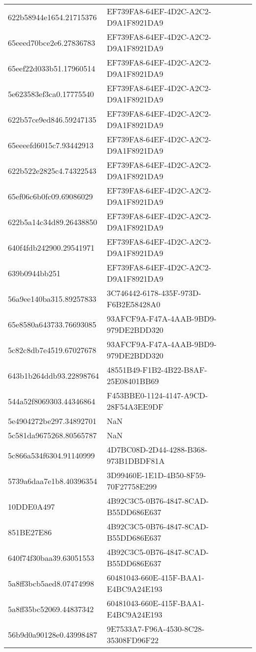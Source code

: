 \begin{tabular}{ll}
622b58944e1654.21715376 & EF739FA8-64EF-4D2C-A2C2-D9A1F8921DA9 \\
65eeed70bce2e6.27836783 & EF739FA8-64EF-4D2C-A2C2-D9A1F8921DA9 \\
65eef22d033b51.17960514 & EF739FA8-64EF-4D2C-A2C2-D9A1F8921DA9 \\
5e623583ef3ca0.17775540 & EF739FA8-64EF-4D2C-A2C2-D9A1F8921DA9 \\
622b57ce9ed846.59247135 & EF739FA8-64EF-4D2C-A2C2-D9A1F8921DA9 \\
65eeeefd6015c7.93442913 & EF739FA8-64EF-4D2C-A2C2-D9A1F8921DA9 \\
622b522e2825c4.74322543 & EF739FA8-64EF-4D2C-A2C2-D9A1F8921DA9 \\
65ef06c6b0fc09.69086029 & EF739FA8-64EF-4D2C-A2C2-D9A1F8921DA9 \\
622b5a14c34d89.26438850 & EF739FA8-64EF-4D2C-A2C2-D9A1F8921DA9 \\
640f4fdb242900.29541971 & EF739FA8-64EF-4D2C-A2C2-D9A1F8921DA9 \\
639b0944bb251 & EF739FA8-64EF-4D2C-A2C2-D9A1F8921DA9 \\
56a9ee140ba315.89257833 & 3C746442-6178-435F-973D-F6B2E58428A0 \\
65e8580a643733.76693085 & 93AFCF9A-F47A-4AAB-9BD9-979DE2BDD320 \\
5c82c8db7e4519.67027678 & 93AFCF9A-F47A-4AAB-9BD9-979DE2BDD320 \\
643b1b264ddb93.22898764 & 48551B49-F1B2-4B22-B8AF-25E08401BB69 \\
544a52f8069303.44346864 & F453BBE0-1124-4147-A9CD-28F54A3EE9DF \\
5e4904272be297.34892701 & NaN \\
5c581da9675268.80565787 & NaN \\
5c866a534f6304.91140999 & 4D7BC08D-2D44-4288-B368-973B1DBDF81A \\
5739a6daa7e1b8.40396354 & 3D99460E-1E1D-4B50-8F59-70F27758E299 \\
10DDE0A497 & 4B92C3C5-0B76-4847-8CAD-B55DD686E637 \\
851BE27E86 & 4B92C3C5-0B76-4847-8CAD-B55DD686E637 \\
640f74f30baa39.63051553 & 4B92C3C5-0B76-4847-8CAD-B55DD686E637 \\
5a8ff3bcb5aed8.07474998 & 60481043-660E-415F-BAA1-E4BC9A24E193 \\
5a8ff35bc52069.44837342 & 60481043-660E-415F-BAA1-E4BC9A24E193 \\
56b9d0a90128e0.43998487 & 9E7533A7-F96A-4530-8C28-35308FD96F22 \\

\end{tabular}
